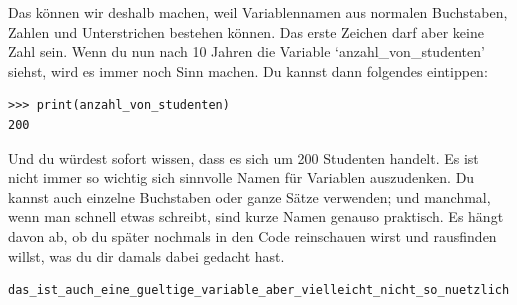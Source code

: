 Das können wir deshalb machen, weil Variablennamen aus normalen Buchstaben, Zahlen und Unterstrichen bestehen können. Das erste Zeichen darf aber keine Zahl sein. Wenn du nun nach 10 Jahren die Variable `anzahl\_von\_studenten' siehst, wird es immer noch Sinn machen. Du kannst dann folgendes eintippen:

\begin{Verbatim}[frame=single]
>>> print(anzahl_von_studenten)
200
\end{Verbatim}

\noindent
Und du würdest sofort wissen, dass es sich um 200 Studenten handelt. Es ist nicht immer so wichtig sich sinnvolle Namen für Variablen auszudenken. Du kannst auch einzelne Buchstaben oder ganze Sätze verwenden; und manchmal, wenn man schnell etwas schreibt, sind kurze Namen genauso praktisch. Es hängt davon ab, ob du später nochmals in den Code reinschauen wirst und rausfinden willst, was du dir damals dabei gedacht hast.

\begin{Verbatim}[frame=single]
das_ist_auch_eine_gueltige_variable_aber_vielleicht_nicht_so_nuetzlich
\end{Verbatim}

